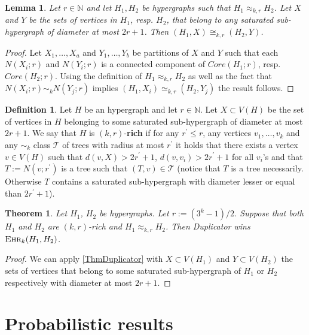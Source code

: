 \documentclass[12pt,notitlepage,a4paper]{article}
\newtheorem{theorem}{Theorem}[section]
\newtheorem{lemma}{Lemma}[section]
\theoremstyle{definition}
\newtheorem{definition}{Definition}[section]
\newcommand{\N}{\mathbb{N}}
\newcommand{\ehr}{\textsc{Ehr}}
\begin{document}
\begin{lemma}
	Let $r\in \N$ and let $H_1, H_2$ be hypergraphs such that 
	$H_1\approx_{k,r} H_2$. Let $X$ and $Y$ be the
	sets of vertices in $H_1$, resp. $H_2$, that
	belong to any saturated sub-hypergraph of diameter 
	at most $2r+1$. Then $(H_1,X)\cong_{k,r} (H_2,Y)$.	
\end{lemma}
\begin{proof}
	Let $X_1,\dots, X_a$ and $Y_1,\dots, Y_b$ be partitions of
	$X$ and $Y$ such that each $N(X_i;r)$ and $N(Y_i;r)$ is 
	a connected component of $Core(H_1;r)$, resp. $Core(H_2;r)$.
	Using the definition of $H_1\approx_{k,r}H_2$ as well 
	as the fact that $N(X_i;r)\sim_k N(Y_j;r)$ implies 
	$(H_1,X_i)\simeq_{k,r} (H_2,Y_j)$ the result follows.	
\end{proof}

\begin{definition}
	Let $H$ be an hypergraph and let $r\in\N$. Let
	$X\subset V(H)$ be the set of vertices in $H$
	belonging to some saturated sub-hypergraph of diameter
	at most $2r+1$.	We say that $H$ is $(k,r)$-\textbf{rich}
	if for any $r^\prime\leq r$, any vertices $v_1,\dots, v_k$ 
	and any $\sim_k$ class $\mathcal{T}$ of trees with radius
	at most $r^\prime$ it holds that there exists a vertex $v\in V(H)$
	such that $d(v,X)> 2r^\prime+1$, $d(v,v_i)>2r^\prime+1$ for all
	$v_i$'s and that $T:=N(v;r^\prime)$ is a tree such that
	$(T,v)\in \mathcal{T}$ (notice that $T$ is a tree necessarily. 
	Otherwise $T$ contains a saturated sub-hypergraph with diameter 
	lesser or equal than $2r^\prime+1$).	
\end{definition}

\begin{theorem}\label{thm:Duplicatorwins}
	Let $H_1$, $H_2$ be hypergraphs. Let $r:=(3^k-1)/2$. Suppose
	that both $H_1$ and $H_2$ are $(k,r)$-rich and
	$H_1\approx_{k,r} H_2$. Then Duplicator wins $\ehr_{k}(H_1,H_2)$.
\end{theorem}
	\begin{proof}
		We can apply \cref{ThmDuplicator} with $X\subset V(H_1)$ 
		and	$Y\subset V(H_2)$ the sets of vertices that belong
		to some saturated sub-hypergraph of $H_1$ or $H_2$ respectively
		with diameter at most $2r+1$.
	\end{proof}


\section{Probabilistic results}
\end{document}
